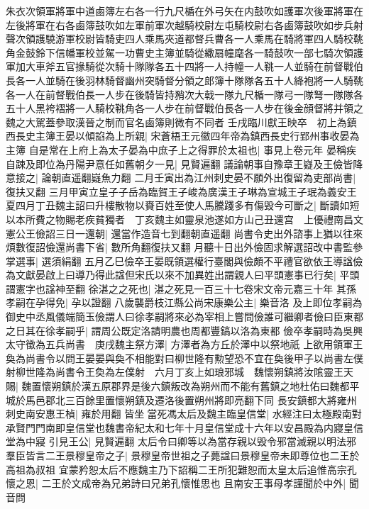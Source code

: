 {朱衣次領軍將軍中道鹵簿左右各一行九尺楯在外弓矢在内鼓吹如護軍次後軍將軍在左後將軍在右各鹵簿鼓吹如左軍前軍次越騎校尉左屯騎校尉右各鹵簿鼓吹如步兵射聲次領護驍游軍校尉皆騎吏四人乘馬夾道都督兵曹各一人乘馬在騎將軍四人騎校鞉角金鼓鈴下信幡軍校並駕一功曹史主簿並騎從繖扇幢麾各一騎鼓吹一部七騎次領護軍加大車斧五官掾騎從次騎十隊隊各五十四將一人持幢一人鞉一人並騎在前督戰伯長各一人並騎在後羽林騎督幽州突騎督分領之郎簿十隊隊各五十人絳袍將一人騎鞉各一人在前督戰伯長一人步在後騎皆持矟次大戟一隊九尺楯一隊弓一隊弩一隊隊各五十人黑袴褶將一人騎校鞉角各一人步在前督戰伯長各一人步在後金顔督將并領之魏之大駕蓋參取漢晉之制而官名鹵簿則微有不同者}
壬戌臨川獻王映卒　初上為鎮西長史主簿王晏以傾諂為上所親|{
	宋蒼梧王元徽四年帝為鎮西長史行郢州事收晏為主簿}
自是常在上府上為太子晏為中庶子上之得罪於太祖也|{
	事見上卷元年}
晏稱疾自踈及即位為丹陽尹意任如舊朝夕一見|{
	見賢遍翻}
議論朝事自豫章王嶷及王儉皆降意接之|{
	論朝直遥翻嶷魚力翻}
二月壬寅出為江州刺史晏不願外出復留為吏部尚書|{
	復扶又翻}
三月甲寅立皇子子岳為臨賀王子峻為廣漢王子琳為宣城王子珉為義安王　夏四月丁丑魏主詔曰升樓散物以賚百姓至使人馬騰踐多有傷毁今可斷之|{
	斷讀如短}
以本所費之物賜老疾貧獨者　丁亥魏主如靈泉池遂如方山己丑還宫　上優禮南昌文憲公王儉詔三日一還朝|{
	還當作造音七到翻朝直遥翻}
尚書令史出外諮事上猶以往來煩數復詔儉還尚書下省|{
	數所角翻復扶又翻}
月聽十日出外儉固求解選詔改中書監參掌選事|{
	選須絹翻}
五月乙巳儉卒王晏既領選權行臺閣與儉頗不平禮官欲依王導諡儉為文獻晏啟上曰導乃得此諡但宋氏以來不加異姓出謂親人曰平頭憲事已行矣|{
	平頭謂憲字也諡神至翻}
徐湛之之死也|{
	湛之死見一百三十七卷宋文帝元嘉三十年}
其孫孝嗣在孕得免|{
	孕以證翻}
八歲襲爵枝江縣公尚宋康樂公主|{
	樂音洛}
及上即位孝嗣為御史中丞風儀端簡玉儉謂人曰徐孝嗣將來必為宰相上嘗問儉誰可繼卿者儉曰臣東都之日其在徐孝嗣乎|{
	謂周公既定洛請明農也周都豐鎬以洛為東都}
儉卒孝嗣時為吳興太守徵為五兵尚書　庚戌魏主祭方澤|{
	方澤者為方丘於澤中以祭地祇}
上欲用領軍王奐為尚書令以問王晏晏與奐不相能對曰柳世隆有勲望恐不宜在奐後甲子以尚書左僕射柳世隆為尚書令王奐為左僕射　六月丁亥上如琅邪城　魏懷朔鎮將汝隂靈王天賜|{
	魏置懷朔鎮於漢五原郡界是後六鎮叛改為朔州而不能有舊鎮之地杜佑曰魏都平城於馬邑郡北三百餘里置懷朔鎮及遷洛後置朔州將即亮翻下同}
長安鎮都大將雍州刺史南安惠王楨|{
	雍於用翻}
皆坐當死馮太后及魏主臨皇信堂|{
	水經注曰太極殿南對承賢門門南即皇信堂也魏書帝紀太和七年十月皇信堂成十六年以安昌殿為内寢皇信堂為中寢}
引見王公|{
	見賢遍翻}
太后令曰卿等以為當存親以毁令邪當滅親以明法邪羣臣皆言二王景穆皇帝之子|{
	景穆皇帝世祖之子薨諡曰景穆皇帝未即尊位也二王於高祖為叔祖}
宜蒙矜恕太后不應魏主乃下詔稱二王所犯難恕而太皇太后追惟高宗孔懷之恩|{
	二王於文成帝為兄弟詩曰兄弟孔懷惟思也}
且南安王事母孝謹聞於中外|{
	聞音問}
